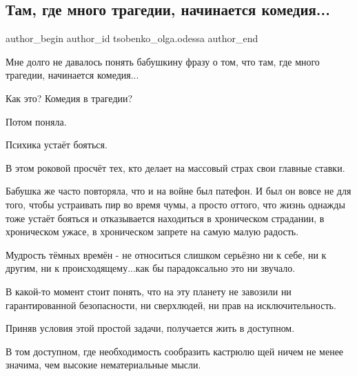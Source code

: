  
 
 
 
 
 
\subsection{Там, где много трагедии, начинается комедия...}
\label{sec:18_12_2022.fb.tsobenko_olga.odessa.1.tragedia_komedia}
 
\ifcmt
 author_begin
   author_id tsobenko_olga.odessa
 author_end
\fi

Мне долго не давалось понять бабушкину фразу о том, что там, где много
трагедии, начинается комедия... 

Как это? Комедия в трагедии? 

Потом поняла. 

Психика устаёт бояться. 

В этом роковой просчёт тех, кто делает на массовый страх свои главные ставки. 

Бабушка же часто повторяла, что и на войне был патефон. И был он вовсе не для
того, чтобы устраивать пир во время чумы, а просто оттого, что жизнь однажды
тоже устаёт бояться и отказывается находиться в хроническом страдании, в
хроническом ужасе, в хроническом запрете на самую малую радость. 

Мудрость тёмных времён - не относиться слишком серьёзно ни к себе, ни к другим,
ни к происходящему...как бы парадоксально это ни звучало. 

В какой-то момент стоит понять, что на эту планету не завозили ни
гарантированной безопасности, ни сверхлюдей, ни прав на исключительность. 

Приняв условия этой простой задачи, получается жить в доступном. 

В том доступном, где необходимость сообразить кастрюлю щей ничем не менее
значима, чем высокие нематериальные мысли. 

